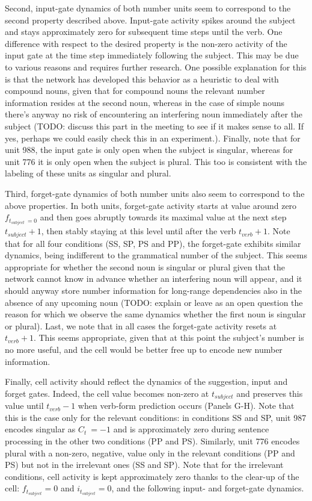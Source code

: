 Second, input-gate dynamics of both number units seem to correspond to the second property described above. 
Input-gate activity spikes around the subject and stays approximately zero for subsequent time steps until the verb. 
One difference with respect to the desired property is the non-zero activity of the input gate at the time step immediately following the subject. 
This may be due to various reasons and requires further research. 
One possible explanation for this is that the network has developed this behavior as a heuristic to deal with compound nouns, given that for compound nouns the relevant number information resides at the second noun, whereas in the case of simple nouns there's anyway no risk of encountering an interfering noun immediately after the subject (TODO: discuss this part in the meeting to see if it makes sense to all. 
If yes, perhaps we could easily check this in an experiment.). 
Finally, note that for unit 988, the input gate is only open when the subject is singular, whereas for unit 776 it is only open when the subject is plural. 
This too is consistent with the labeling of these units as singular and plural.

Third, forget-gate dynamics of both number units also seem to correspond to the above properties. 
In both units, forget-gate activity starts at value around zero $f_{t_{subject}~=0}$ and then goes abruptly towards its maximal value at the next step $t_{subject}+1$, then stably staying at this level until after the verb $t_{verb}+1$. 
Note that for all four conditions (SS, SP, PS and PP), the forget-gate exhibits similar dynamics, being indifferent to the grammatical number of the subject. 
This seems appropriate for whether the second noun is singular or plural given that the network cannot know in advance whether an interfering noun will appear, and it should anyway store number information for long-range dependencies also in the absence of any upcoming noun (TODO: explain or leave as an open question the reason for which we observe the same dynamics whether the first noun is singular or plural). 
Last, we note that in all cases the forget-gate activity resets at $t_{verb}+1$. 
This seems appropriate, given that at this point the subject's number is no more useful, and the cell would be better free up to encode new number information.
 
Finally, cell activity should reflect the dynamics of the suggestion, input and forget gates. 
Indeed, the cell value becomes non-zero at $t_{subject}$ and preserves this value until $t_{verb}-1$ when verb-form prediction occurs (Panels G-H). 
Note that this is the case only for the relevant conditions: in conditions SS and SP, unit 987 encodes singular as $C_t ~= -1$ and is approximately zero during sentence processing in the other two conditions (PP and PS). 
Similarly, unit 776 encodes plural with a non-zero, negative, value only in the relevant conditions (PP and PS) but not in the irrelevant ones (SS and SP). 
Note that for the irrelevant conditions, cell activity is kept approximately zero thanks to the clear-up of the cell: $f_{t_{subject}}=0$ and $i_{t_{subject}}=0$, and the following input- and forget-gate dynamics.


